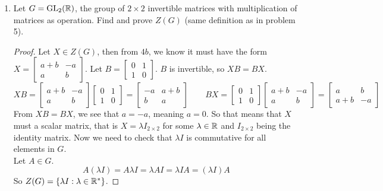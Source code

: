 \documentclass[12pt]{article}
\begin{document}
\begin{enumerate}
		\item Let $G = \text{GL}_2(\mathbb{R})$, the group of $2\times2$ invertible matrices with multiplication of matrices as operation. Find and prove $Z(G)$ (same definition as in problem 5).
		\begin{proof}
			Let $X \in Z(G)$, then from $4b$, we know it must have the form $X = \begin{bmatrix}
				a+b & -a\\
				a & b
			\end{bmatrix}$. Let $B = \begin{bmatrix}
				0 & 1\\
				1 & 0
			\end{bmatrix}$. $B$ is invertible, so $XB = BX$.
			\[XB = \begin{bmatrix}
				a+b & -a\\
				a & b
			\end{bmatrix}\begin{bmatrix}
				0 & 1\\
				1 & 0
			\end{bmatrix} = \begin{bmatrix}
				-a & a+b\\
				b & a
			\end{bmatrix} \qquad BX = \begin{bmatrix}
				0 & 1\\
				1 & 0
			\end{bmatrix}\begin{bmatrix}
				a+b & -a\\
				a & b
			\end{bmatrix} = \begin{bmatrix}
				a & b\\
				a+b & -a
			\end{bmatrix}\]
			From $XB = BX$, we see that $a=-a$, meaning $a=0$. So that means that $X$ must a scalar matrix, that is $X = \lambda I_{2\times2}$ for some $\lambda \in \mathbb{R}$ and $I_{2\times2}$ being the identity matrix. Now we need to check that $\lambda I$ is commutative for all elements in $G$.\\
			Let $A \in G$.
			\[A(\lambda I) = A \lambda I = \lambda A I = \lambda I A = (\lambda I) A\]
			So $Z(G) = \{\lambda I : \lambda \in \mathbb{R}^*\}$.
		\end{proof}
	\end{enumerate}
\end{document}

